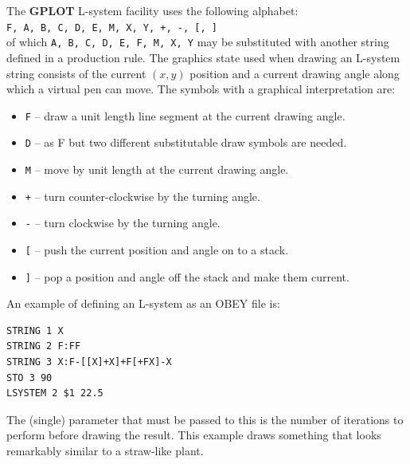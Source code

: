 \documentclass[a4paper,twoside,11pt]{article}
\newcommand{\newpara}{\par\vspace{4mm}\noindent}
\begin{document}
\newpara
The \textbf{GPLOT} L-system facility uses the following alphabet:\\
\texttt{F, A, B, C, D, E, M, X, Y, +, -, [, ]}\\
of which \texttt{A, B, C, D, E, F, M, X, Y} may be substituted with another string defined in a production rule.
The graphics state used when drawing an L-system string consists of the current $(x,y)$ position and a current
drawing angle along which a virtual pen can move. The symbols with a graphical interpretation are:
\begin{itemize}
\item \texttt{F} -- draw a unit length line segment at the current drawing angle.
\item \texttt{D} -- as F but two different substitutable draw symbols are needed.
\item \texttt{M} -- move by unit length at the current drawing angle.
\item \texttt{+} -- turn counter-clockwise by the turning angle.
\item \texttt{-} -- turn clockwise by the turning angle.
\item \texttt{[} -- push the current position and angle on to a stack.
\item \texttt{]} -- pop a position and angle off the stack and make them current.
\end{itemize}
\newpara
An example of defining an L-system as an OBEY file is:
\begin{verbatim}
STRING 1 X
STRING 2 F:FF
STRING 3 X:F-[[X]+X]+F[+FX]-X 
STO 3 90
LSYSTEM 2 $1 22.5
\end{verbatim}
The (single) parameter that must be passed to this is the number of iterations to perform
before drawing the result. This example draws something that looks remarkably similar to
a straw-like plant.
\end{document}
